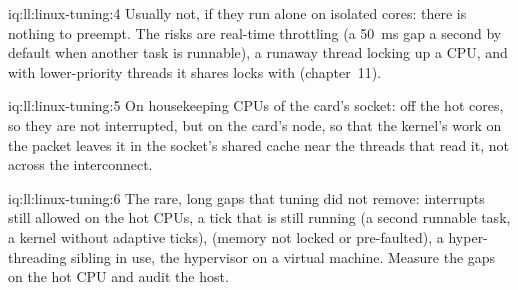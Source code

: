 \begin{solution}{iq:ll:linux-tuning:4}
Usually not, if they run alone on isolated cores: there is nothing to preempt. The risks are real-time throttling (a
\qty{50}{\milli\second} gap a second by default when another task is runnable), a runaway thread locking up a CPU, and
 with lower-priority threads it shares locks with (chapter~11).
\end{solution}

\begin{solution}{iq:ll:linux-tuning:5}
On housekeeping CPUs of the card's socket: off the hot cores, so they are not interrupted, but on the card's node, so that the
kernel's work on the packet leaves it in the socket's shared cache near the threads that read it, not across the
interconnect.
\end{solution}

\begin{solution}{iq:ll:linux-tuning:6}
The rare, long gaps that tuning did not remove: interrupts still allowed on the hot CPUs, a tick that is still running (a
second runnable task, a kernel without adaptive ticks),  (memory not locked or pre-faulted), a hyper-threading
sibling in use, the hypervisor on a virtual machine. Measure the gaps on the hot CPU and audit the host.
\end{solution}
